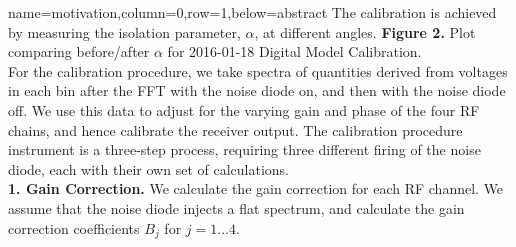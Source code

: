 \documentclass[a0paper,portrait]{baposter}
\begin{document}
\begin{poster}
{}
{name=motivation,column=0,row=1,below=abstract}
{\small{The calibration is achieved by measuring the isolation parameter, $\alpha$, at different angles.}
\small{\textbf{Figure 2.} Plot comparing before/after $\alpha$ for 2016-01-18 Digital Model Calibration.\\
For the calibration procedure, we take spectra of quantities derived from voltages in each bin after the FFT with the noise diode on, and then with the noise diode off. We use this data to adjust for the varying gain and phase of the four RF chains, and hence calibrate the receiver output. The calibration procedure instrument is a three-step process, requiring three different firing of the noise diode, each with their own set of calculations.\\
\textbf{1. Gain Correction.} We calculate the gain correction for each RF channel. We assume that the noise diode injects a flat spectrum, and calculate the gain correction coefficients $B_{j}$ for $j=1...4$.}
}
\end{poster}
\end{document}
